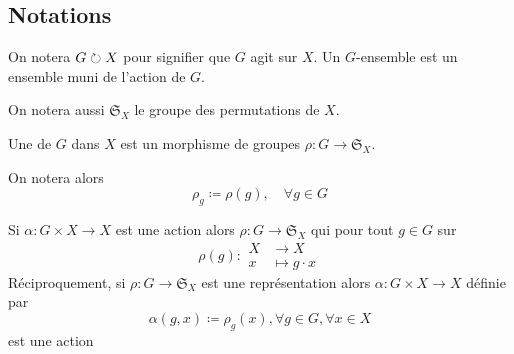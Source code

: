 \subsection*{Notations}

On notera \(G \circlearrowright X\) pour signifier que \(G\) agit sur \(X\).
Un \(G\)-ensemble est un ensemble muni de l'action de \(G\).

On notera aussi \({\mathfrak{S}}_X\) le groupe des permutations de \(X\).

\begin{definition}
    Une  de \(G\) dans \(X\) est un
    morphisme de groupes \(\rho : G \to {\mathfrak{S}}_X\).
\end{definition}

\begin{notation}
    On notera alors 
    \begin{equation*}
        \rho_g\coloneq \rho(g),\quad \forall g \in G
    \end{equation*}
\end{notation}

\begin{exo}
    Si \(\alpha : G\times X \to X\) est une action alors
    \(\rho : G\to {\mathfrak{S}}_X\) qui pour tout \(g\in G\) sur
    \begin{equation*}
        \rho(g) :
        \begin{aligned}
            X &\to X\\
            x &\mapsto g\cdot x
        \end{aligned}
    \end{equation*}
    Réciproquement, si \(\rho : G\to {\mathfrak{S}}_X\) est une représentation
    alors \(\alpha : G\times X \to X\) définie par
    \begin{equation*}
        \alpha(g,x)\coloneq \rho_g(x),\forall g\in G,\forall x\in X
    \end{equation*}
    est une action
\end{exo}

